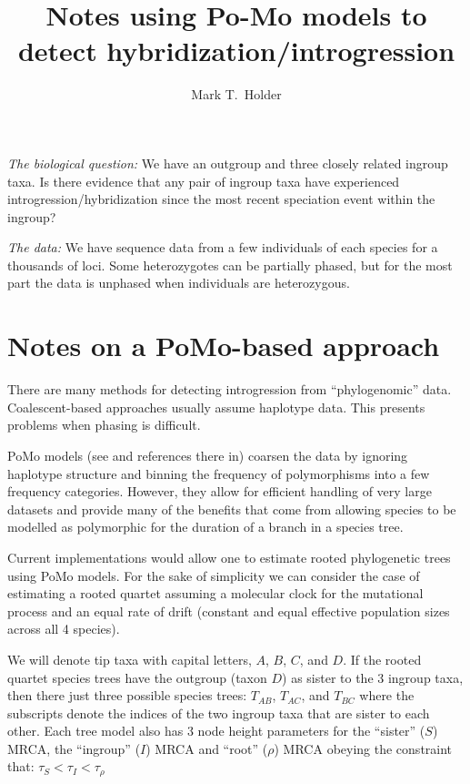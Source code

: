 \documentclass{article}
\title{Notes using Po-Mo models to detect hybridization/introgression}
\author{Mark T.~Holder}
\begin{document}
\maketitle

{\em The biological question:} We have an outgroup and three closely related ingroup taxa. Is there evidence that any pair of ingroup taxa have experienced introgression/hybridization since the most recent speciation event within the ingroup?

{\em The data:} We have sequence data from a few individuals of each species for a thousands of loci.  Some heterozygotes can be partially phased, but for the most part the data is unphased when individuals are heterozygous.

\section{Notes on a PoMo-based approach}
There are many methods for detecting introgression \cite{HibbinsHahn2021,HibbinsHahn2022} from ``phylogenomic'' data.
Coalescent-based approaches usually assume haplotype data.
This presents problems when phasing is difficult.

PoMo models (see \cite{schrempf2016reversible,borges2020consistency} and references there in) coarsen 
the data by ignoring haplotype structure and binning the frequency of polymorphisms into a few frequency categories.
However, they allow for efficient handling of very large datasets and provide many of the benefits that come from allowing 
species to be modelled as polymorphic for the duration of a branch in a species tree.

Current implementations would allow one to estimate rooted phylogenetic trees using PoMo models.
For the sake of simplicity we can consider the case of estimating a rooted quartet assuming a molecular clock for the mutational process and an equal rate of drift (constant and equal effective population sizes across all 4 species).

We will denote tip taxa with capital letters, $A$, $B$, $C$, and $D$.
If the rooted quartet species trees have the outgroup (taxon $D$) as sister to the 3 ingroup taxa, then there just three
possible species trees: $T_{AB}$, $T_{AC}$, and $T_{BC}$ where the subscripts denote the indices of the two ingroup
taxa that are sister to each other.
Each tree model also has 3 node height parameters for the ``sister'' ($S$) MRCA, the ``ingroup'' ($I$) MRCA and ``root'' ($\rho$) MRCA obeying the constraint that: $\tau_S < \tau_I < \tau_\rho$
\end{document}
